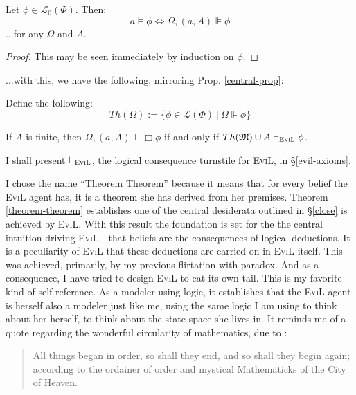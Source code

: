 \begin{lemma}[Truthiness]\label{truthiness}
  Let $\phi \in \mathcal{L}_0 (\Phi)$.  Then:
  \[ a \models \phi \Longleftrightarrow \Omega, (a, A) \VDash \phi \]
  $\ldots$for any $\Omega$ and $A$.
\end{lemma}
\begin{proof}
  This may be seen immediately by induction on $\phi$.
\end{proof}

$\ldots$with this, we have the following, mirroring Prop. \ref{central-prop}:
\begin{definition}  Define the following:
 $$Th(\Omega) := \{ \phi \in \mathcal{L}(\Phi) \ |\ \Omega \VDash \phi \}$$
\end{definition}

\begin{theorem}\label{theorem-theorem}
  If $A$ is finite, then $\Omega, (a,A) \VDash \Box \phi$ if and only if $Th(\Omega) \cup A \vdash_{\text{\textsc{EviL}}} \phi$.
\end{theorem}

I shall present $\vdash_{\text{\textsc{EviL}}}$, the logical consequence turnstile for \textsc{EviL}, in \S\ref{evil-axioms}.

I chose the name ``Theorem Theorem'' because it means that for every
belief the \textsc{EviL} agent has, it is a theorem she has derived
from her premises. Theorem \ref{theorem-theorem} establishes one of
the central desiderata outlined in \S\ref{close} is achieved by
\textsc{EviL}.  With this result the foundation is set for the the
central intuition driving \textsc{EviL} - that beliefs are the
consequences of logical deductions.  It is a peculiarity of
\textsc{EviL} that these deductions are carried on in \textsc{EviL}
itself.  This was achieved, primarily, by my previous flirtation with
paradox.  And as a consequence, I have tried to design \textsc{EviL}
to eat its own tail. This is my favorite kind of self-reference. As a
modeler using logic, it establishes that the \textsc{EviL} agent is
herself also a modeler just like me, using the same logic I am using
to think about her herself, to think about the state space she lives
in.  It reminds me of a quote regarding the wonderful circularity of
mathematics, due to \citet{browne_garden_1736}:
\begin{quote}
All things began in order, so shall they end, and so shall they begin
again; according to the ordainer of order and mystical Mathematicks of
the City of Heaven.\end{quote}

